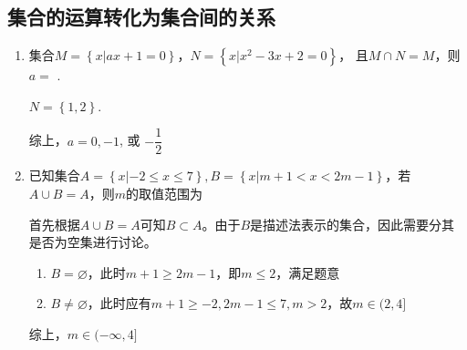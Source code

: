 \subsection*{集合的运算转化为集合间的关系}
\begin{enumerate}
    \item 集合$M = \left\{x | ax + 1 = 0\right\}$，$N = \left\{x | x^2-3x+2=0\right\}$， 且$M \cap N = M$，则 $a = $ .
    \begin{jieda}
        $N = \left\{1, 2\right\}$. 
        综上，$a = 0, -1$, 或 $-\dfrac{1}{2}$
    \end{jieda}
    \item 已知集合$A = \left\{x | -2 \leq x \leq 7\right\}, B = \left\{x | m+1 < x < 2m-1\right\}$，若$A \cup B = A$，则$m$的取值范围为\blkda{$(-\infty, 4]$}
    \begin{jieda}
        首先根据$A \cup B = A$可知$B \subset A$。由于$B$是描述法表示的集合，因此需要分其是否为空集进行讨论。
        \begin{enumerate}
            \item $B = \varnothing$，此时$m+1 \geq 2m -1$，即$m \leq 2$，满足题意
            \item $B \neq \varnothing$，此时应有$m+1 \geq -2, 2m-1 \leq 7, m > 2$，故$m \in (2, 4]$
        \end{enumerate}
        综上，$m \in (-\infty, 4]$
    \end{jieda}
\end{enumerate}
